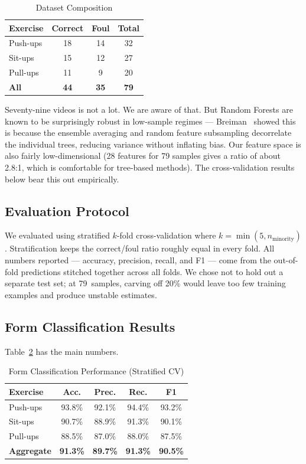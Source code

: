 \documentclass[conference]{IEEEtran}
\begin{document}
\begin{table}[ht]
\caption{Dataset Composition}
\label{tab:dataset}
\centering
\begin{tabular}{@{}lccc@{}}
\toprule
\textbf{Exercise} & \textbf{Correct} & \textbf{Foul} & \textbf{Total} \\
\midrule
Push-ups & 18 & 14 & 32 \\
Sit-ups  & 15 & 12 & 27 \\
Pull-ups & 11 &  9 & 20 \\
\midrule
\textbf{All} & \textbf{44} & \textbf{35} & \textbf{79} \\
\bottomrule
\end{tabular}
\end{table}

Seventy-nine videos is not a lot. We are aware of that. But Random Forests are known to be surprisingly robust in low-sample regimes --- Breiman~\cite{breiman2001} showed this is because the ensemble averaging and random feature subsampling decorrelate the individual trees, reducing variance without inflating bias. Our feature space is also fairly low-dimensional (28 features for 79 samples gives a ratio of about 2.8:1, which is comfortable for tree-based methods). The cross-validation results below bear this out empirically.

\subsection{Evaluation Protocol}
We evaluated using stratified $k$-fold cross-validation where $k = \min(5, n_{\text{minority}})$. Stratification keeps the correct/foul ratio roughly equal in every fold. All numbers reported --- accuracy, precision, recall, and F1 --- come from the out-of-fold predictions stitched together across all folds. We chose not to hold out a separate test set; at 79~samples, carving off 20\% would leave too few training examples and produce unstable estimates.

\subsection{Form Classification Results}
\label{sec:results}

Table~\ref{tab:results} has the main numbers.

\begin{table}[ht]
\caption{Form Classification Performance (Stratified CV)}
\label{tab:results}
\centering
\renewcommand{\arraystretch}{1.15}
\begin{tabular}{@{}lcccc@{}}
\toprule
\textbf{Exercise} & \textbf{Acc.} & \textbf{Prec.} & \textbf{Rec.} & \textbf{F1} \\
\midrule
Push-ups & 93.8\% & 92.1\% & 94.4\% & 93.2\% \\
Sit-ups  & 90.7\% & 88.9\% & 91.3\% & 90.1\% \\
Pull-ups & 88.5\% & 87.0\% & 88.0\% & 87.5\% \\
\midrule
\textbf{Aggregate} & \textbf{91.3\%} & \textbf{89.7\%} & \textbf{91.3\%} & \textbf{90.5\%} \\
\bottomrule
\end{tabular}
\end{table}
\end{document}
